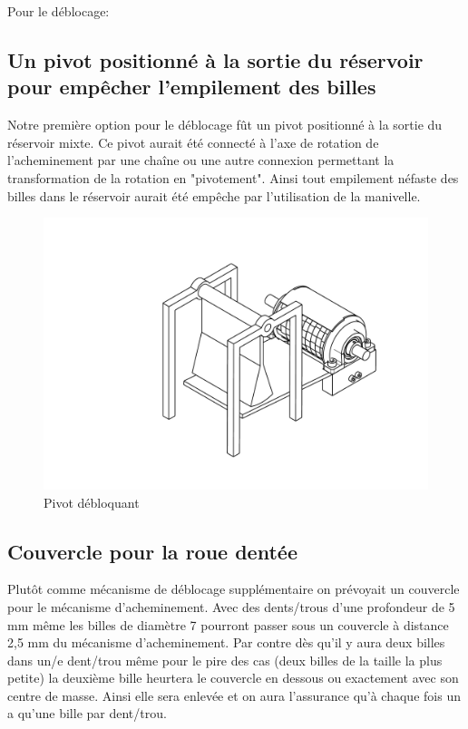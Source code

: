 Pour le déblocage:
\subsection{Un pivot positionné à la sortie du réservoir pour empêcher l'empilement des billes} 
Notre première option pour le déblocage fût un pivot positionné à la sortie du réservoir mixte. Ce pivot aurait été connecté à l'axe de rotation de l'acheminement par une chaîne ou une autre connexion permettant la transformation de la rotation en "pivotement". Ainsi tout empilement néfaste des billes dans le réservoir aurait été empêche par l'utilisation de la manivelle.

\begin{figure}
    \centering
    \includegraphics[width=\textwidth]{Graphics/Roue/DRAWING_PIVOT.pdf}
    \caption{Pivot débloquant}
\end{figure}

\subsection{Couvercle pour la roue dentée}
Plutôt comme mécanisme de déblocage supplémentaire on prévoyait un couvercle pour le mécanisme d'acheminement. Avec des dents/trous d'une profondeur de 5 mm même les billes de diamètre 7 pourront passer sous un couvercle à distance 2,5 mm du mécanisme d'acheminement. Par contre dès qu'il y aura deux billes dans un/e dent/trou même pour le pire des cas (deux billes de la taille la plus petite) la deuxième bille heurtera le couvercle en dessous ou exactement avec son centre de masse. Ainsi elle sera enlevée et on aura l'assurance qu'à chaque fois un a qu'une bille par dent/trou.

